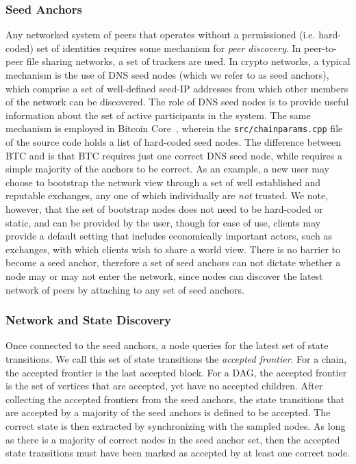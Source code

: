 \documentclass[runningheads]{llncs}
\begin{document}
\subsubsection{Seed Anchors}
Any networked system of peers that operates without a permissioned (i.e. hard-coded) set of identities requires some mechanism for \emph{peer discovery}. 
In peer-to-peer file sharing networks, a set of trackers are used. 
In crypto networks, a typical mechanism is the use of DNS seed nodes (which we refer to as seed anchors), which comprise a set of well-defined seed-IP addresses from which other members of the network can be discovered. 
The role of DNS seed nodes is to provide useful information about the set of active participants in the system. 
The same mechanism is employed in Bitcoin Core~\cite{bitcoin_2018}, wherein the \texttt{src/chainparams.cpp} file of the source code holds a list of hard-coded seed nodes. 
The difference between BTC and \AVAPlatformName{} is that BTC requires just one correct DNS seed node, while \AVAPlatformName{} requires a simple majority of the anchors to be correct. 
As an example, a new user may choose to bootstrap the network view through a set of well established and reputable exchanges, any one of which individually are \emph{not} trusted. 
We note, however, that the set of bootstrap nodes does not need to be hard-coded or static, and can be provided by the user, though for ease of use, clients may provide a default setting that includes economically important actors, such as exchanges, with which clients wish to share a world view. 
There is no barrier to become a seed anchor, therefore a set of seed anchors can not dictate whether a node may or may not enter the network, since nodes can discover the latest network of \AVAPlatformName{} peers by attaching to any set of seed anchors.

\subsubsection{Network and State Discovery}
Once connected to the seed anchors, a node queries for the latest set of state transitions. We call this set of state transitions the \emph{accepted frontier}. For a chain, the accepted frontier is the last accepted block. For a DAG, the accepted frontier is the set of vertices that are accepted, yet have no accepted children. After collecting the accepted frontiers from the seed anchors, the state transitions that are accepted by a majority of the seed anchors is defined to be accepted. The correct state is then extracted by synchronizing with the sampled nodes.
As long as there is a majority of correct nodes in the seed anchor set, then the accepted state transitions must have been marked as accepted by at least one correct node.
\end{document}

